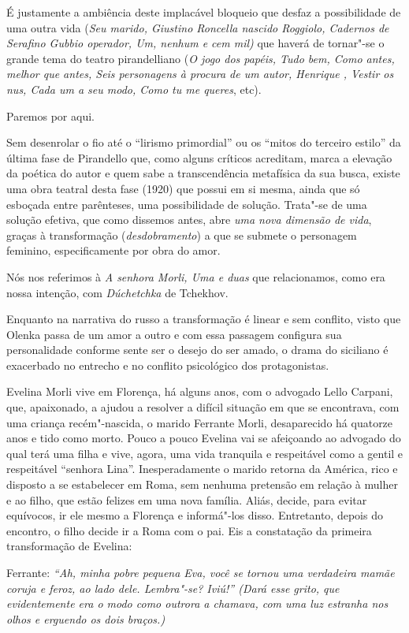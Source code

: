 É justamente a ambiência deste implacável bloqueio que desfaz a
possibilidade de uma outra vida (\emph{Seu marido, Giustino Roncella
nascido Roggiolo, Cadernos de Serafino Gubbio operador, Um, nenhum e cem
mil)} que haverá de tornar"-se o grande tema do teatro pirandelliano
(\emph{O jogo dos papéis, Tudo bem, Como antes, melhor que antes, Seis
personagens à procura de um autor, Henrique , Vestir os nus, Cada um a
seu modo, Como tu me queres}, etc).

Paremos por aqui.

Sem desenrolar o fio até o ``lirismo primordial'' ou os ``mitos do
terceiro estilo'' da última fase de Pirandello que, como alguns críticos
acreditam, marca a elevação da poética do autor e quem sabe a
transcendência metafísica da sua busca, existe uma obra teatral desta
fase (1920) que possui em si mesma, ainda que só esboçada entre
parênteses, uma possibilidade de solução. Trata"-se de uma solução
efetiva, que como dissemos antes, abre \emph{uma nova dimensão de vida},
graças à transformação (\emph{desdobramento}) a que se submete o
personagem feminino, especificamente por obra do amor.

Nós nos referimos à \emph{A senhora Morli, Uma e duas} que relacionamos,
como era nossa intenção, com \emph{Dúchetchka} de Tchekhov.

Enquanto na narrativa do russo a transformação é linear e sem conflito,
visto que Olenka passa de um amor a outro e com essa passagem configura
sua personalidade conforme sente ser o desejo do ser amado, o drama do
siciliano é exacerbado no entrecho e no conflito psicológico dos
protagonistas.

Evelina Morli vive em Florença, há alguns anos, com o advogado Lello
Carpani, que, apaixonado, a ajudou a resolver a difícil situação em que
se encontrava, com uma criança recém"-nascida, o marido Ferrante Morli,
desaparecido há quatorze anos e tido como morto. Pouco a pouco Evelina
vai se afeiçoando ao advogado do qual terá uma filha e vive, agora, uma vida
tranquila e respeitável como a gentil e respeitável ``senhora
Lina''. Inesperadamente o marido retorna da América, rico e disposto a
se estabelecer em Roma, sem nenhuma pretensão em relação à mulher e ao
filho, que estão felizes em uma nova família. Aliás, decide, para evitar
equívocos, ir ele mesmo a Florença e informá"-los disso. Entretanto,
depois do encontro, o filho decide ir a Roma com o pai. Eis a constatação
da primeira transformação de Evelina:

Ferrante: \emph{``Ah, minha pobre pequena Eva, você se tornou uma
verdadeira mamãe coruja e feroz, ao lado dele. Lembra"-se? Iviú!'' (Dará
esse grito, que evidentemente era o modo como outrora a chamava, com uma
luz estranha nos olhos e erguendo os dois braços.)}

